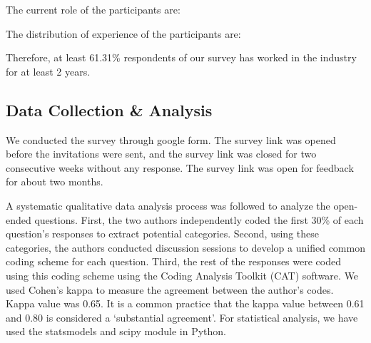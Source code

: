 The current role of the participants are: 


The distribution of experience of the participants are:


Therefore, at least 61.31\% respondents of our survey has worked in the industry for at least 2 years.



\subsection{Data Collection \& Analysis}
\label{survey_data_collection}

We conducted the survey through google form. The survey link was opened before the invitations were sent, and the survey link was closed for two consecutive weeks without any response. The survey link was open for feedback for about two months. 

A systematic qualitative data analysis process was followed to analyze the open-ended questions. First, the two authors independently coded the first 30\% of each question's responses to extract potential categories. Second, using these categories, the authors conducted discussion sessions to develop a unified common coding scheme for each question. Third, the rest of the responses were coded using this coding scheme using the Coding Analysis Toolkit (CAT)\cite{Lu2008} software. We used Cohen's kappa\cite{Cohen1960} to measure the agreement between the author's codes. Kappa value was 0.65. It is a common practice that the kappa value between 0.61 and 0.80\cite{Landis1977} is considered a `substantial agreement’. For statistical analysis, we have used the statsmodels\cite{seabold2010} and scipy\cite{scipy2020} module in Python.
 
